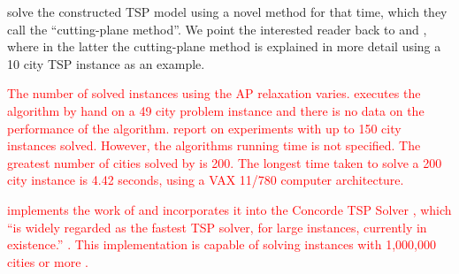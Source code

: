 \documentclass{mprop}
\theoremstyle{definition}
\begin{document}



\citet{Dantzig54} solve the constructed TSP model using a novel method for that time, which they call the ``cutting-plane method''. We point the interested reader back to \citep{Dantzig54} and \citep{Dantzig59}, where in the latter the cutting-plane method is explained in more detail using a 10 city TSP instance as an example.

\textcolor{red}{
The number of solved instances using the AP relaxation varies. \citet{Dantzig54} executes the algorithm by hand on a 49 city problem instance and there is no data on the performance of the algorithm. \citet{Jonker80} report on experiments with up to 150 city instances solved. However, the algorithms running time is not specified. The greatest number of cities solved by \citet{Fischetti92} is 200. The longest time taken to solve a 200 city instance is 4.42 seconds, using a VAX 11/780 computer architecture.
}

\textcolor{red}{
\citet{Applegate03} implements the work of \citet{Dantzig54} and incorporates it into the Concorde TSP Solver \citep{concorde}, which ``is widely regarded as the fastest TSP solver, for large instances, currently in existence.'' \citep{Mulder03}. This implementation is capable of solving instances with 1,000,000 cities or more \citep{Applegate03}.
}
\end{document}
